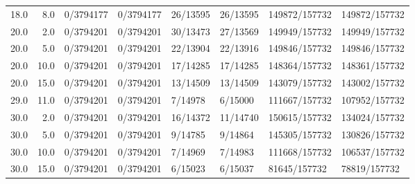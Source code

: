 \begin{tabular}{rrllllll}
18.0 &  8.0 &       0/3794177 &  0/3794177 &    26/13595 &   26/13595 & 149872/157732 & 149872/157732 \\
20.0 &  2.0 &       0/3794201 &  0/3794201 &    30/13473 &   27/13569 & 149949/157732 & 149949/157732 \\
20.0 &  5.0 &       0/3794201 &  0/3794201 &    22/13904 &   22/13916 & 149846/157732 & 149846/157732 \\
20.0 & 10.0 &       0/3794201 &  0/3794201 &    17/14285 &   17/14285 & 148364/157732 & 148361/157732 \\
20.0 & 15.0 &       0/3794201 &  0/3794201 &    13/14509 &   13/14509 & 143079/157732 & 143002/157732 \\
29.0 & 11.0 &       0/3794201 &  0/3794201 &     7/14978 &    6/15000 & 111667/157732 & 107952/157732 \\
30.0 &  2.0 &       0/3794201 &  0/3794201 &    16/14372 &   11/14740 & 150615/157732 & 134024/157732 \\
30.0 &  5.0 &       0/3794201 &  0/3794201 &     9/14785 &    9/14864 & 145305/157732 & 130826/157732 \\
30.0 & 10.0 &       0/3794201 &  0/3794201 &     7/14969 &    7/14983 & 111668/157732 & 106537/157732 \\
30.0 & 15.0 &       0/3794201 &  0/3794201 &     6/15023 &    6/15037 &  81645/157732 &  78819/157732 \\
\bottomrule
\end{tabular}
